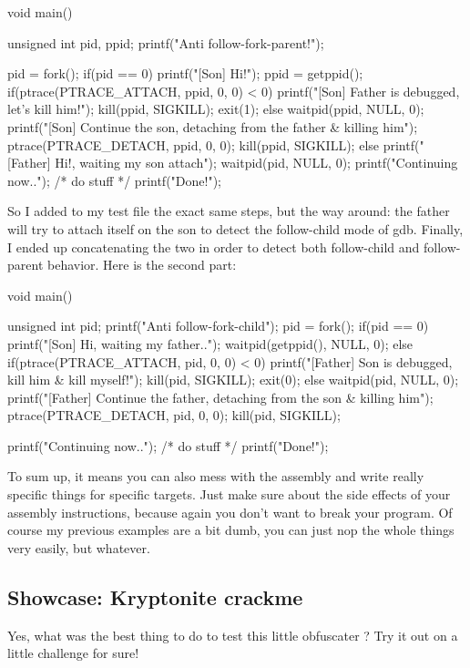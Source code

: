 \documentclass[a4paper, 11pt, notitlepage]{report}
\begin{document}
\begin{ccode}
void main()
{
    unsigned int pid, ppid;
    printf("Anti follow-fork-parent!\n");

    pid = fork();
    if(pid == 0)
    {
        printf("[Son] Hi!\n");
        ppid = getppid();
        if(ptrace(PTRACE_ATTACH, ppid, 0, 0) < 0)
        {
            printf("[Son] Father is debugged, let's kill him!");
            kill(ppid, SIGKILL);
            exit(1);
        }
        else
        {
            waitpid(ppid, NULL, 0);
            printf("[Son] Continue the son, detaching from the father & killing him\n");
            ptrace(PTRACE_DETACH, ppid, 0, 0);
            kill(ppid, SIGKILL);
        }
    }
    else
    {
        printf("[Father] Hi!, waiting my son attach\n");
        waitpid(pid, NULL, 0);
    }
    printf("Continuing now..\n");
   /* do stuff */
    printf("Done!\n");
}
\end{ccode}
So I added to my test file the exact same steps, but the way around: the father will try to attach itself on the son to detect the follow-child mode of gdb. Finally, I ended up concatenating the two in order to detect both follow-child and follow-parent behavior. Here is the second part:
\begin{ccode}
void main()
{
    unsigned int pid;
    printf("Anti follow-fork-child\n");
    pid = fork();
    if(pid == 0)
    {
        printf("[Son] Hi, waiting my father..\n");
        waitpid(getppid(), NULL, 0);
    }
    else
    {
        if(ptrace(PTRACE_ATTACH, pid, 0, 0) < 0)
        {
            printf("[Father] Son is debugged, kill him & kill myself!");
            kill(pid, SIGKILL);
            exit(0);
        }
        else
        {
            waitpid(pid, NULL, 0);
            printf("[Father] Continue the father, detaching from the son & killing him\n");
            ptrace(PTRACE_DETACH, pid, 0, 0);
            kill(pid, SIGKILL);
        }
    }

    printf("Continuing now..\n");
   /* do stuff */
    printf("Done!\n");
}
\end{ccode}

To sum up, it means you can also mess with the assembly and write really specific things for specific targets. Just make sure about the side effects of your assembly instructions, because again you don't want to break your program. Of course my previous examples are a bit dumb, you can just nop the whole things very easily, but whatever.
\subsection{Showcase: Kryptonite crackme}
Yes, what was the best thing to do to test this little obfuscater ? Try it out on a little challenge for sure!
\end{document}
